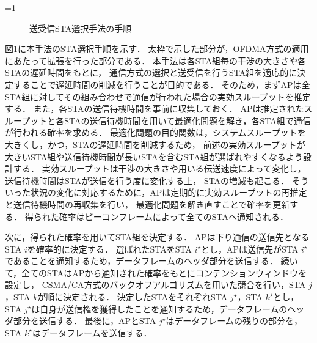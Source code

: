 \documentclass[master]{kuisthesis}		%
\newcommand{\sij}{(i,j)}
\def\equiv{\mathrel{\mathop:}=}
\newcommand{\sijk}{(i,j,k)}
\newcommand{\rijk}{r^{(i,j,k)}}
\newcounter{flagFig}
\begin{document}
				\ifnum\value{flagFig}=1 {\begin{figure}[htbp]
					\centering
					\caption{送受信STA選択手法の手順}
					\label{fig:process}
				\end{figure}}\fi
				図\ref{fig:process}に本手法のSTA選択手順を示す．
				太枠で示した部分が，OFDMA方式の適用にあたって拡張を行った部分である．
				本手法は各STA組毎の干渉の大きさや各STAの遅延時間をもとに，
				通信方式の選択と送受信を行うSTA組を適応的に決定することで遅延時間の削減を行うことが目的である．
				そのため，まずAPは全STA組に対してその組み合わせで通信が行われた場合の実効スループットを推定する．
				また，各STAの送信待機時間を事前に収集しておく．
				APは推定されたスループットと各STAの送信待機時間を用いて最適化問題を解き，各STA組で通信が行われる確率を求める．
				最適化問題の目的関数は，システムスループットを大きくし，かつ，STAの遅延時間を削減するため，
				前述の実効スループットが大きいSTA組や送信待機時間が長いSTAを含むSTA組が選ばれやすくなるよう設計する．
				実効スループットは干渉の大きさや用いる伝送速度によって変化し，送信待機時間はSTAが送信を行う度に変化する上，
				STAの増減も起こる．
				そういった状況の変化に対応するために，APは定期的に実効スループットの再推定と送信待機時間の再収集を行い，
				最適化問題を解き直すことで確率を更新する．
				得られた確率はビーコンフレームによって全てのSTAへ通知される．
				\par
				次に，得られた確率を用いてSTA組を決定する．
				APは下り通信の送信先となるSTA $i$を確率的に決定する．
				選ばれたSTAをSTA $i^{\star}$とし，APは送信先がSTA $i^{\star}$であることを通知するため，データフレームのヘッダ部分を送信する．
				続いて，全てのSTAはAPから通知された確率をもとにコンテンションウィンドウを設定し，
				CSMA/CA方式のバックオフアルゴリズムを用いた競合を行い，STA $j$，STA $k$が順に決定される．
				決定したSTAをそれぞれSTA $j^{\star}$，STA $k^{\star}$とし，
				STA $j^{\star}$は自身が送信権を獲得したことを通知するため，データフレームのヘッダ部分を送信する．
				最後に，APとSTA $j^{\star}$はデータフレームの残りの部分を，STA $k^{\star}$はデータフレームを送信する．
\end{document}
